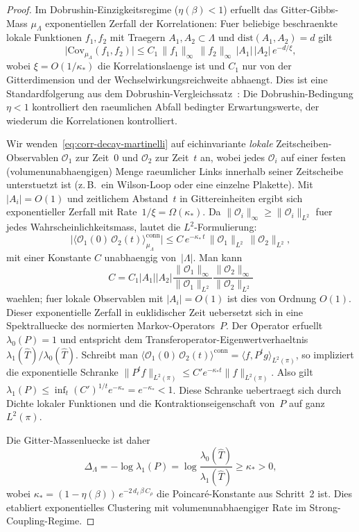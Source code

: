 \documentclass[12pt,a4paper]{article}
\theoremstyle{definition}
\theoremstyle{plain}
\theoremstyle{remark}
\begin{document}
\begin{proof}
Im Dobrushin-Einzigkeitsregime ($\eta(\beta) < 1$) erfuellt das Gitter-Gibbs-Mass $\mu_\Lambda$ exponentiellen Zerfall der Korrelationen: Fuer beliebige beschraenkte lokale Funktionen $f_1, f_2$ mit Traegern $A_1, A_2 \subset \Lambda$ und $\mathrm{dist}(A_1, A_2) = d$ gilt
\begin{equation}\label{eq:corr-decay-martinelli}
    \bigl|\mathrm{Cov}_{\mu_\Lambda}(f_1, f_2)\bigr| \leq C_1\,\|f_1\|_\infty\,\|f_2\|_\infty\,|A_1|\,|A_2|\,e^{-d/\xi},
\end{equation}
wobei $\xi = O(1/\kappa_*)$ die Korrelationslaenge ist und $C_1$ nur von der Gitterdimension und der Wechselwirkungsreichweite abhaengt. Dies ist eine Standardfolgerung aus dem Dobrushin-Vergleichssatz~\cite{DobrushinShlosman1985, Martinelli1999, GuionnetZegarlinski2003}: Die Dobrushin-Bedingung $\eta < 1$ kontrolliert den raeumlichen Abfall bedingter Erwartungswerte, der wiederum die Korrelationen kontrolliert.

Wir wenden~\eqref{eq:corr-decay-martinelli} auf eichinvariante \emph{lokale} Zeitscheiben-Observablen $\mathcal{O}_1$ zur Zeit~$0$ und $\mathcal{O}_2$ zur Zeit~$t$ an, wobei jedes $\mathcal{O}_i$ auf einer festen (volumenunabhaengigen) Menge raeumlicher Links innerhalb seiner Zeitscheibe unterstuetzt ist (z.\,B.\ ein Wilson-Loop oder eine einzelne Plakette). Mit $|A_i| = O(1)$ und zeitlichem Abstand~$t$ in Gittereinheiten ergibt sich exponentieller Zerfall mit Rate~$1/\xi = \Omega(\kappa_*)$. Da $\|\mathcal{O}_i\|_\infty \geq \|\mathcal{O}_i\|_{L^2}$ fuer jedes Wahrscheinlichkeitsmass, lautet die $L^2$-Formulierung:
\[
    \bigl|\langle \mathcal{O}_1(0)\,\mathcal{O}_2(t)\rangle_{\mu_\Lambda}^{\mathrm{conn}}\bigr|
    \leq C\,e^{-\kappa_*\,t}\,\|\mathcal{O}_1\|_{L^2}\,\|\mathcal{O}_2\|_{L^2},
\]
mit einer Konstante $C$ unabhaengig von~$|\Lambda|$.
Man kann
\[
  C =
  C_1 |A_1| |A_2|
  \frac{\|\mathcal{O}_1\|_\infty}{\|\mathcal{O}_1\|_{L^2}}
  \frac{\|\mathcal{O}_2\|_\infty}{\|\mathcal{O}_2\|_{L^2}}
\]
waehlen; fuer lokale Observablen mit $|A_i| = O(1)$ ist dies von Ordnung
$O(1)$. Dieser exponentielle Zerfall in euklidischer Zeit uebersetzt sich in
eine Spektralluecke des normierten Markov-Operators~$P$. Der Operator erfuellt
$\lambda_0(P) = 1$ und entspricht dem Transferoperator-Eigenwertverhaeltnis
$\lambda_1(\hat{T})/\lambda_0(\hat{T})$. Schreibt man
$\langle \mathcal{O}_1(0)\,\mathcal{O}_2(t)\rangle^{\mathrm{conn}}
= \langle f, P^t g\rangle_{L^2(\pi)}$, so impliziert die exponentielle
Schranke $\|P^t f\|_{L^2(\pi)} \leq C'e^{-\kappa_*t}\|f\|_{L^2(\pi)}$.
Also gilt $\lambda_1(P) \leq \inf_t (C')^{1/t}e^{-\kappa_*}
= e^{-\kappa_*} < 1$. Diese Schranke uebertraegt sich durch Dichte lokaler
Funktionen und die Kontraktionseigenschaft von~$P$ auf ganz~$L^2(\pi)$.

Die Gitter-Massenluecke ist daher
\begin{equation}
    \Delta_\Lambda = -\log\lambda_1(P) = \log\frac{\lambda_0(\hat{T})}{\lambda_1(\hat{T})} \geq \kappa_* > 0,
\end{equation}
wobei $\kappa_* = (1 - \eta(\beta))\,e^{-2\,d_\ell\,\beta\,C_\rho}$ die Poincar\'e-Konstante aus Schritt~2 ist.
Dies etabliert exponentielles Clustering mit volumenunabhaengiger Rate im Strong-Coupling-Regime.
\end{proof}
\end{document}
